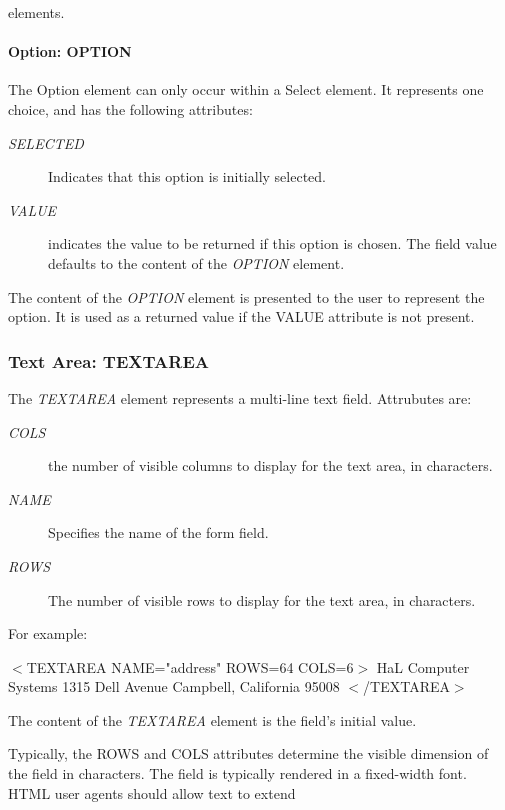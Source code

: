 elements.
\par \paragraph*{Option:  OPTION}\par 
The Option element can only occur within a Select element.  It
represents one choice, and has the following attributes:
\par \begin{description}\item[{\it SELECTED}]
Indicates that this option is initially selected.
\item[{\it VALUE}]
indicates the value to be returned if this
option is chosen.  The field value defaults to the content of the
{\it OPTION} element.
\end{description}\par 
The content of the {\it OPTION} element is presented to the user to
represent the option.  It is used as a returned value if the VALUE
attribute is not present.
\par \subsubsection*{Text Area:  TEXTAREA}\par 
The {\it TEXTAREA} element represents a multi-line text
field.  Attrubutes are:
\par \begin{description}\item[{\it COLS}]
the number of visible columns to display for the text area,
in characters.
\item[{\it NAME}]
Specifies the name of the form field.
\item[{\it ROWS}]
The number of visible rows to display for the text area, in
characters.
\end{description}\par 
For example:
\par $<$TEXTAREA NAME="address" ROWS=64 COLS=6$>$
HaL Computer Systems
1315 Dell Avenue
Campbell, California 95008
$<$/TEXTAREA$>$
\par 
The content of the {\it TEXTAREA} element is the field's initial
value.
\par \par 
Typically, the ROWS and COLS attributes determine the visible
dimension of the field in characters.  The field is typically rendered
in a fixed-width font.  HTML user agents should allow text to extend
